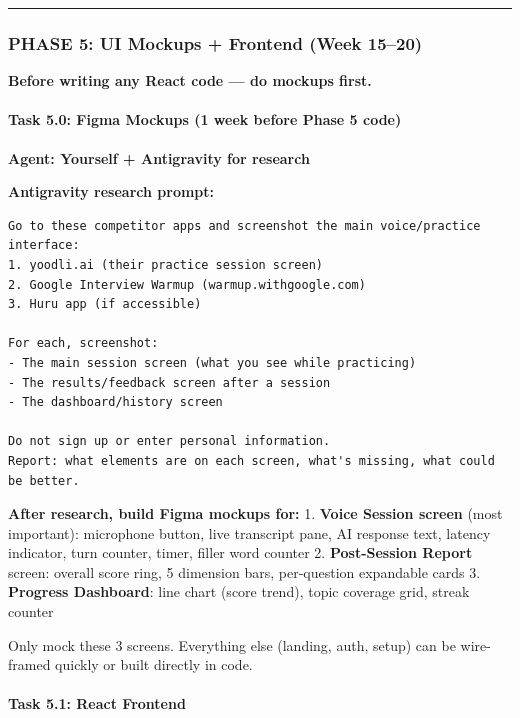 \documentclass[
  11pt,
]{article}
\begin{document}
\begin{center}\rule{0.5\linewidth}{0.5pt}\end{center}

\hypertarget{phase-5-ui-mockups-frontend-week-1520}{%
\subsubsection{PHASE 5: UI Mockups + Frontend (Week
15--20)}\label{phase-5-ui-mockups-frontend-week-1520}}

\textbf{Before writing any React code --- do mockups first.}

\hypertarget{task-5.0-figma-mockups-1-week-before-phase-5-code}{%
\paragraph{Task 5.0: Figma Mockups (1 week before Phase 5
code)}\label{task-5.0-figma-mockups-1-week-before-phase-5-code}}

\textbf{Agent: Yourself + Antigravity for research}

\textbf{Antigravity research prompt:}

\begin{lstlisting}
Go to these competitor apps and screenshot the main voice/practice interface:
1. yoodli.ai (their practice session screen)
2. Google Interview Warmup (warmup.withgoogle.com)
3. Huru app (if accessible)

For each, screenshot:
- The main session screen (what you see while practicing)
- The results/feedback screen after a session
- The dashboard/history screen

Do not sign up or enter personal information.
Report: what elements are on each screen, what's missing, what could be better.
\end{lstlisting}

\textbf{After research, build Figma mockups for:} 1. \textbf{Voice
Session screen} (most important): microphone button, live transcript
pane, AI response text, latency indicator, turn counter, timer, filler
word counter 2. \textbf{Post-Session Report} screen: overall score ring,
5 dimension bars, per-question expandable cards 3. \textbf{Progress
Dashboard}: line chart (score trend), topic coverage grid, streak
counter

Only mock these 3 screens. Everything else (landing, auth, setup) can be
wire-framed quickly or built directly in code.

\hypertarget{task-5.1-react-frontend}{%
\paragraph{Task 5.1: React Frontend}\label{task-5.1-react-frontend}}
\end{document}
